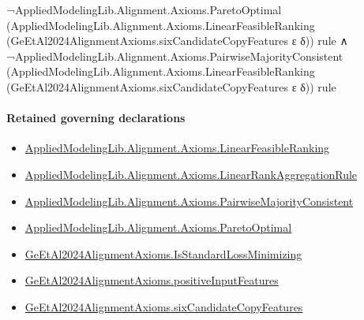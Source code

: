 \documentclass[10pt]{article}
\begin{document}
\begin{ReviewVerbatim}
                                      ¬AppliedModelingLib.Alignment.Axioms.ParetoOptimal
                                            (AppliedModelingLib.Alignment.Axioms.LinearFeasibleRanking
                                              (GeEtAl2024AlignmentAxioms.sixCandidateCopyFeatures ε δ))
                                            rule ∧
                                        ¬AppliedModelingLib.Alignment.Axioms.PairwiseMajorityConsistent
                                            (AppliedModelingLib.Alignment.Axioms.LinearFeasibleRanking
                                              (GeEtAl2024AlignmentAxioms.sixCandidateCopyFeatures ε δ))
                                            rule
\end{ReviewVerbatim}

\paragraph{Retained governing declarations}
\begin{itemize}\raggedright
\item \hyperlink{library-prerequisite-3c30aae25bef2671}{Applied\allowbreak{}Modeling\allowbreak{}Lib.\allowbreak{}Alignment.\allowbreak{}Axioms.\allowbreak{}Linear\allowbreak{}Feasible\allowbreak{}Ranking}
\item \hyperlink{library-prerequisite-43447e121a1884f9}{Applied\allowbreak{}Modeling\allowbreak{}Lib.\allowbreak{}Alignment.\allowbreak{}Axioms.\allowbreak{}Linear\allowbreak{}Rank\allowbreak{}Aggregation\allowbreak{}Rule}
\item \hyperlink{library-prerequisite-e6dee3706881b80a}{Applied\allowbreak{}Modeling\allowbreak{}Lib.\allowbreak{}Alignment.\allowbreak{}Axioms.\allowbreak{}Pairwise\allowbreak{}Majority\allowbreak{}Consistent}
\item \hyperlink{library-prerequisite-80fdf9d21d096dc8}{Applied\allowbreak{}Modeling\allowbreak{}Lib.\allowbreak{}Alignment.\allowbreak{}Axioms.\allowbreak{}Pareto\allowbreak{}Optimal}
\item \hyperlink{governing-declaration-6270e302eb520ccb}{Ge\allowbreak{}Et\allowbreak{}Al2024\allowbreak{}Alignment\allowbreak{}Axioms.\allowbreak{}Is\allowbreak{}Standard\allowbreak{}Loss\allowbreak{}Minimizing}
\item \hyperlink{governing-declaration-fc820626832083e1}{Ge\allowbreak{}Et\allowbreak{}Al2024\allowbreak{}Alignment\allowbreak{}Axioms.\allowbreak{}positive\allowbreak{}Input\allowbreak{}Features}
\item \hyperlink{governing-declaration-f2ecd36c5ee0c77a}{Ge\allowbreak{}Et\allowbreak{}Al2024\allowbreak{}Alignment\allowbreak{}Axioms.\allowbreak{}six\allowbreak{}Candidate\allowbreak{}Copy\allowbreak{}Features}
\end{itemize}
\end{document}
